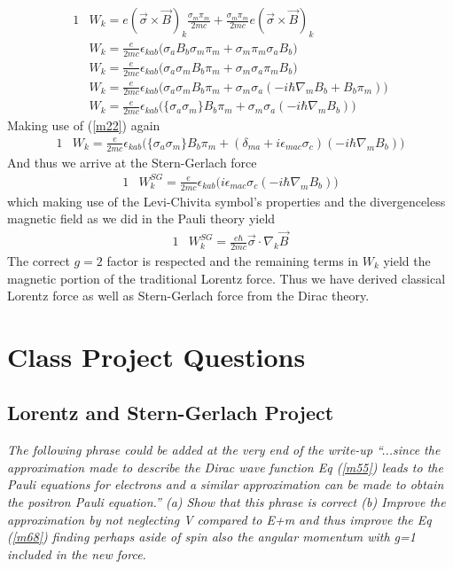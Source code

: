 \documentclass[]{article}
\numberwithin{equation}{subsection}
\begin{document}
\begin{alignat}{1}
  \label{m61}		&W_{k}=e(\vec{\sigma}\times\vec{B})_{k}\frac{\sigma_{m}\pi_{m}}{2mc}+\frac{\sigma_{m}\pi_{m}}{2mc}e(\vec{\sigma}\times\vec{B})_{k}\\
  \label{m62}            &W_{k}=\frac{e}{2mc}\epsilon_{kab}\Big(\sigma_{a}B_{b}\sigma_{m}\pi_{m}+\sigma_{m}\pi_{m}\sigma_{a}B_{b}\Big)\\
  \label{m63}            &W_{k}=\frac{e}{2mc}\epsilon_{kab}\Big(\sigma_{a}\sigma_{m}B_{b}\pi_{m}+\sigma_{m}\sigma_{a}\pi_{m}B_{b}\Big)\\
  \label{m64}            &W_{k}=\frac{e}{2mc}\epsilon_{kab}\Big(\sigma_{a}\sigma_{m}B_{b}\pi_{m}+\sigma_{m}\sigma_{a}(-i\hbar\nabla_{m}B_{b}+B_{b}\pi_{m})\Big)\\
  \label{m65}            &W_{k}=\frac{e}{2mc}\epsilon_{kab}\Big(\{\sigma_{a}\sigma_{m}\}B_{b}\pi_{m}+\sigma_{m}\sigma_{a}(-i\hbar\nabla_{m}B_{b})\Big)
\end{alignat}
Making use of (\ref{m22}) again
\begin{alignat}{1}
  \label{m66}            &W_{k}=\frac{e}{2mc}\epsilon_{kab}\Big(\{\sigma_{a}\sigma_{m}\}B_{b}\pi_{m}+(\delta_{ma}+i\epsilon_{mac}\sigma_{c})(-i\hbar\nabla_{m}B_{b})\Big)
\end{alignat}
And thus we arrive at the Stern-Gerlach force
\begin{alignat}{1}
  \label{m67}            &W^{SG}_{k}=\frac{e}{2mc}\epsilon_{kab}\Big(i\epsilon_{mac}\sigma_{c}(-i\hbar\nabla_{m}B_{b})\Big)
\end{alignat}
which making use of the Levi-Chivita symbol's properties and the divergenceless magnetic field as we did in the Pauli theory yield
\begin{alignat}{1}
  \label{m68}            &W^{SG}_{k}=\frac{e\hbar}{2mc}\vec{\sigma}\cdot\nabla_{k}\vec{B}
\end{alignat}
The correct $g=2$ factor is respected and the remaining terms in $W_{k}$ yield the magnetic portion of the traditional Lorentz force. Thus we have derived classical Lorentz force as well as Stern-Gerlach force from the Dirac theory.

\section{Class Project Questions}
\subsection{Lorentz and Stern-Gerlach Project}
\emph{The following phrase could be added at the very end of the write-up ``...since the  approximation made to describe the Dirac wave function Eq (\ref{m55}) leads to the Pauli equations for electrons and a similar approximation can be made to obtain the positron Pauli  equation.'' (a) Show  that this phrase is correct (b) Improve the approximation by not neglecting V compared to E+m and thus improve the Eq (\ref{m68}) finding perhaps aside of spin  also the angular momentum  with g=1  included in the new force.}\\
\end{document}
